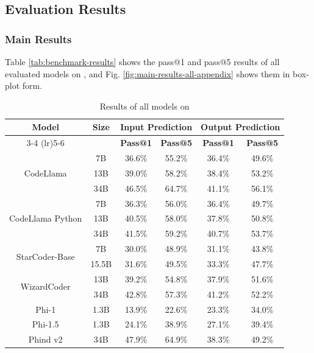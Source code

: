 \subsection{Evaluation Results} \label{sec:appendix-quantitative}

\subsubsection{Main Results}
Table \ref{tab:benchmark-results} shows the pass@1 and pass@5 results of all evaluated models on \benchmark, and Fig. \ref{fig:main-results-all-appendix} shows them in box-plot form.

\begin{table}[htbp]
    \centering
    \caption{Results of all models on \benchmark}
    \begin{tabular}{cccccc}
        \toprule
        \multirow{2}{*}{\textbf{Model}} & \multirow{2}{*}{\textbf{Size}} & \multicolumn{2}{c}{\textbf{Input Prediction}} & \multicolumn{2}{c}{\textbf{Output Prediction}} \\
        \cmidrule(lr){3-4} \cmidrule(lr){5-6}
        & & \textbf{Pass@1} & \textbf{Pass@5} & \textbf{Pass@1} & \textbf{Pass@5} \\
	\midrule
	\multirow{3}{*}{CodeLlama}
	& 7B & 36.6\% & 55.2\% & 36.4\% & 49.6\% \\
	& 13B & 39.0\% & 58.2\% & 38.4\% & 53.2\% \\
	& 34B & 46.5\% & 64.7\% & 41.1\% & 56.1\% \\
	\midrule
	\multirow{3}{*}{CodeLlama Python}
	& 7B & 36.3\% & 56.0\% & 36.4\% & 49.7\% \\
	& 13B & 40.5\% & 58.0\% & 37.8\% & 50.8\% \\
	& 34B & 41.5\% & 59.2\% & 40.7\% & 53.7\% \\
	\midrule
	\multirow{2}{*}{StarCoder-Base}
	& 7B & 30.0\% & 48.9\% & 31.1\% & 43.8\% \\
	& 15.5B & 31.6\% & 49.5\% & 33.3\% & 47.7\% \\
	\midrule
	\multirow{2}{*}{WizardCoder}
	& 13B & 39.2\% & 54.8\% & 37.9\% & 51.6\% \\
	& 34B & 42.8\% & 57.3\% & 41.2\% & 52.2\% \\
	\midrule
	Phi-1
	& 1.3B & 13.9\% & 22.6\% & 23.3\% & 34.0\% \\
	\midrule
	Phi-1.5
	& 1.3B & 24.1\% & 38.9\% & 27.1\% & 39.4\% \\
	\midrule
	Phind v2
	& 34B & 47.9\% & 64.9\% & 38.3\% & 49.2\% \\

\end{tabular}
\end{table}
